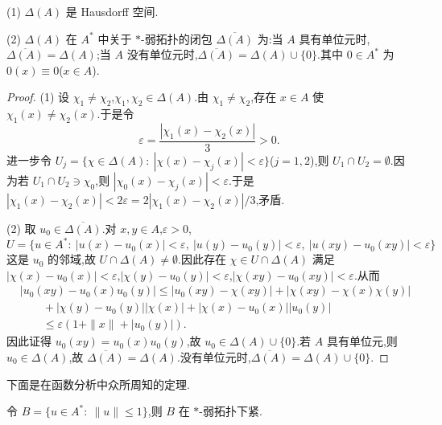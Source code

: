 \begin{lemma}\label{lem:3.1.23}

(1) $\Delta(A)$ 是 Hausdorff 空间.

(2) $\Delta(A)$ 在 $A^{*}$ 中关于 $*$-弱拓扑的闭包 $\overline{\Delta(A)}$ 为:当 $A$ 具有单位元时,$\overline{\Delta(A)} = \Delta(A)$;当 $A$ 没有单位元时,$\overline{\Delta(A)} = \Delta(A) \cup \{0\}$.其中 $0 \in A^{*}$ 为 $0(x) \equiv 0$($x \in A$).
\end{lemma}

\begin{proof}
(1) 设 $\chi_{1} \neq \chi_{2}$,$\chi_{1}, \chi_{2} \in \Delta(A)$.由 $\chi_{1} \neq \chi_{2}$,存在 $x \in A$ 使 $\chi_{1}(x) \neq \chi_{2}(x)$.于是令
\begin{equation*}
\varepsilon = \frac{|\chi_{1}(x) - \chi_{2}(x)|}{3} > 0.
\end{equation*}
进一步令 $U_{j} = \{\chi \in \Delta(A):\ |\chi(x) - \chi_{j}(x)| < \varepsilon\}$($j = 1, 2$),则 $U_{1} \cap U_{2} = \emptyset$.因为若 $U_{1} \cap U_{2} \ni \chi_{0}$,则 $|\chi_{0}(x) - \chi_{j}(x)| < \varepsilon$.于是 $|\chi_{1}(x) - \chi_{2}(x)| < 2\varepsilon = 2|\chi_{1}(x) - \chi_{2}(x)|/3$,矛盾.

(2) 取 $u_{0} \in \overline{\Delta(A)}$.对 $x, y \in A$,$\varepsilon > 0$,
\begin{equation*}
U = \{u \in A^{*}:\ |u(x) - u_{0}(x)| < \varepsilon,\ |u(y) - u_{0}(y)| < \varepsilon,\ |u(xy) - u_{0}(xy)| < \varepsilon\}
\end{equation*}
这是 $u_{0}$ 的邻域,故 $U \cap \Delta(A) \neq \emptyset$.因此存在 $\chi \in U \cap \Delta(A)$ 满足 $|\chi(x) - u_{0}(x)| < \varepsilon$,$|\chi(y) - u_{0}(y)| < \varepsilon$,$|\chi(xy) - u_{0}(xy)| < \varepsilon$.从而
\begin{align*}
& |u_{0}(xy) - u_{0}(x)u_{0}(y)| \leq |u_{0}(xy) - \chi(xy)| + |\chi(xy) - \chi(x)\chi(y)| \\
& \qquad + |\chi(y) - u_{0}(y)||\chi(x)| + |\chi(x) - u_{0}(x)||u_{0}(y)| \\
& \qquad \leq \varepsilon(1 + \|x\| + |u_{0}(y)|).
\end{align*}
因此证得 $u_{0}(xy) = u_{0}(x)u_{0}(y)$,故 $u_{0} \in \Delta(A) \cup \{0\}$.若 $A$ 具有单位元,则 $u_{0} \in \Delta(A)$,故 $\overline{\Delta(A)} = \Delta(A)$.没有单位元时,$\overline{\Delta(A)} = \Delta(A) \cup \{0\}$.
\end{proof}

下面是在函数分析中众所周知的定理.

\begin{theorem}\label{thm:3.1.24}
令 $B = \{u \in A^{*}:\ \|u\| \leq 1\}$,则 $B$ 在 $*$-弱拓扑下紧.
\end{theorem}

